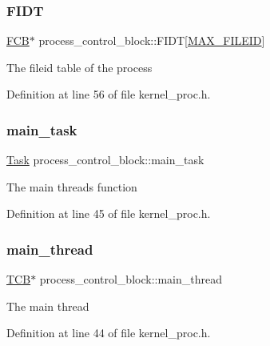 \subsubsection{\texorpdfstring{F\+I\+DT}{FIDT}}
{\footnotesize\ttfamily \hyperlink{group__streams_ga0c7e751afb9d6cadebf070961804d400}{F\+CB}$\ast$ process\+\_\+control\+\_\+block\+::\+F\+I\+DT\mbox{[}\hyperlink{group__syscalls_ga9c697bf9e856897ad75f28190a6f0b68}{M\+A\+X\+\_\+\+F\+I\+L\+E\+ID}\mbox{]}}

The fileid table of the process 

Definition at line 56 of file kernel\+\_\+proc.\+h.

\mbox{\label{structprocess__control__block_a7d4ddbf8f67ac2bfe9774796b818354e}} 
\subsubsection{\texorpdfstring{main\+\_\+task}{main\_task}}
{\footnotesize\ttfamily \hyperlink{group__syscalls_gaec3f2f835e105271fbbc00272c0ba984}{Task} process\+\_\+control\+\_\+block\+::main\+\_\+task}

The main thread\textquotesingle{}s function 

Definition at line 45 of file kernel\+\_\+proc.\+h.

\mbox{\label{structprocess__control__block_a3b7a2a952ec5c19d7331307639c78482}} 
\subsubsection{\texorpdfstring{main\+\_\+thread}{main\_thread}}
{\footnotesize\ttfamily \hyperlink{group__scheduler_gaf88d9c946bf70b36a1e8bc34383abfc9}{T\+CB}$\ast$ process\+\_\+control\+\_\+block\+::main\+\_\+thread}

The main thread 

Definition at line 44 of file kernel\+\_\+proc.\+h.

\mbox{\label{structprocess__control__block_af20d0c36862c6def80024b4586ff8934}} 
